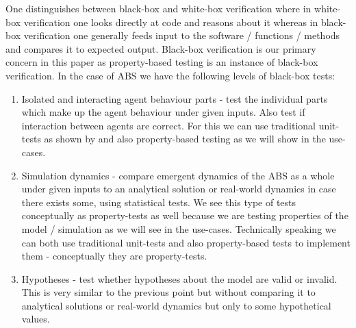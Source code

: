 One distinguishes between black-box and white-box verification where in white-box verification one looks directly at code and reasons about it whereas in black-box verification one generally feeds input to the software / functions / methods and compares it to expected output. Black-box verification is our primary concern in this paper as property-based testing is an instance of black-box verification. In the case of ABS we have the following levels of black-box tests:
\begin{enumerate}
	\item Isolated and interacting agent behaviour parts - test the individual parts which make up the agent behaviour under given inputs. Also test if interaction between agents are correct. For this we can use traditional unit-tests as shown by \cite{collier_test-driven_2013} and also property-based testing as we will show in the use-cases.
	\item Simulation dynamics - compare emergent dynamics of the ABS as a whole under given inputs to an analytical solution or real-world dynamics in case there exists some, using statistical tests. We see this type of tests conceptually as property-tests as well because we are testing properties of the model / simulation as we will see in the use-cases. Technically speaking we can both use traditional unit-tests and also property-based tests to implement them - conceptually they are property-tests.
	\item Hypotheses - test whether hypotheses about the model are valid or invalid. This is very similar to the previous point but without comparing it to analytical solutions or real-world dynamics but only to some hypothetical values.
\end{enumerate}